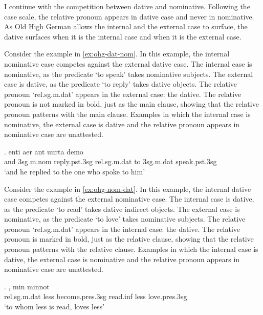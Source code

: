 I continue with the competition between dative and nominative. Following the case scale, the relative pronoun appears in dative case and never in nominative. As Old High German allows the internal and the external case to surface, the dative surfaces when it is the internal case and when it is the external case.

Consider the example in \ref{ex:ohg-dat-nom}. In this example, the internal nominative case competes against the external dative case.
The internal case is nominative, as the predicate  `to speak' takes nominative subjects.
The external case is dative, as the predicate  `to reply' takes dative objects.
The relative pronoun  `\ac{rel}.\ac{sg}.\ac{m}.\ac{dat}' appears in the external case: the dative. The relative pronoun is not marked in bold, just as the main clause, showing that the relative pronoun patterns with the main clause.
Examples in which the internal case is nominative, the external case is dative and the relative pronoun appears in nominative case are unattested.

\exg. enti aer {ant uurta} demo  \\
and 3\ac{sg}.\ac{m}.\ac{nom} reply.\ac{pst}.3\ac{sg}\scsub{[dat]} \ac{rel}.\ac{sg}.\ac{m}.\ac{dat} {to 3\ac{sg}.\ac{m}.\ac{dat}} speak.\ac{pst}.3\ac{sg}\scsub{[nom]}\\
`and he replied to the one who spoke to him' \label{ex:ohg-dat-nom}

Consider the example in \ref{ex:ohg-nom-dat}. In this example, the internal dative case competes against the external nominative case.
The internal case is dative, as the predicate  `to read' takes dative indirect objects.
The external case is nominative, as the predicate  `to love' takes nominative subjects.
The relative pronoun  `\ac{rel}.\ac{sg}.\ac{m}.\ac{dat}' appears in the internal case: the dative. The relative pronoun is marked in bold, just as the relative clause, showing that the relative pronoun patterns with the relative clause.
Examples in which the internal case is dative, the external case is nominative and the relative pronoun appears in nominative case are unattested.

\exg.    , min minnot\\
\ac{rel}.\ac{sg}.\ac{m}.\ac{dat} less become.\ac{pres}.3\ac{sg} read.\ac{inf}\scsub{[dat]} less love.\ac{pres}.3\ac{sg}\scsub{[nom]}\\
`to whom less is read, loves less' \label{ex:ohg-nom-dat}

